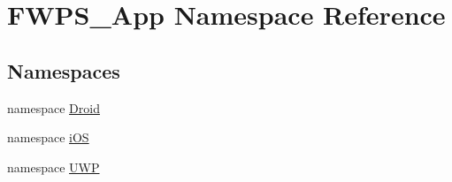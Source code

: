 \hypertarget{namespace_f_w_p_s___app}{}\section{F\+W\+P\+S\+\_\+\+App Namespace Reference}
\label{namespace_f_w_p_s___app}
\subsection*{Namespaces}
\begin{DoxyCompactItemize}
\item 
namespace \mbox{\hyperlink{namespace_f_w_p_s___app_1_1_droid}{Droid}}
\item 
namespace \mbox{\hyperlink{namespace_f_w_p_s___app_1_1i_o_s}{i\+OS}}
\item 
namespace \mbox{\hyperlink{namespace_f_w_p_s___app_1_1_u_w_p}{U\+WP}}
\end{DoxyCompactItemize}
